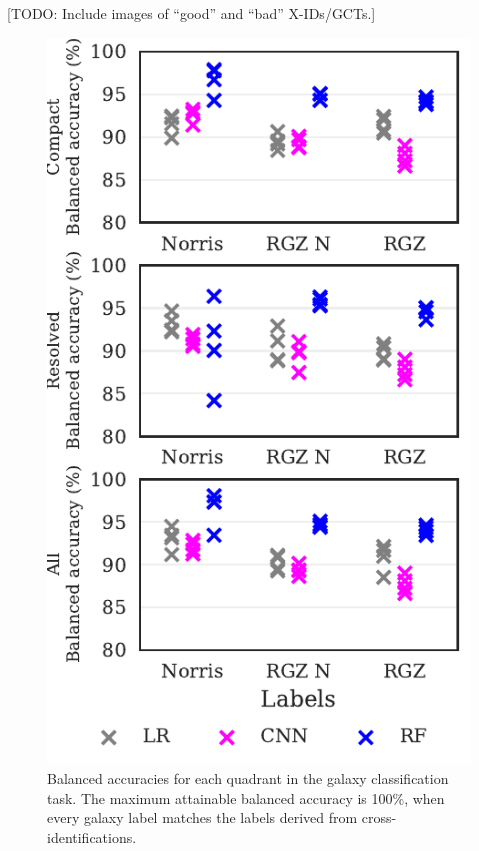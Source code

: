 \documentclass[fleqn,usenatbib,usedcolumn]{mnras}
\begin{document}
  {[}TODO: Include images of ``good'' and ``bad'' X-IDs/GCTs.{]}
  \begin{figure}
  \centering
  \includegraphics[width=\columnwidth]{images/cdfs_ba_grid.pdf}
  \caption{Balanced accuracies for each quadrant in the galaxy
    classification task. The maximum attainable balanced accuracy
    is 100\%, when every galaxy label matches the labels derived
    from \citet{norris06} cross-identifications.\label{fig:ba}}
  \end{figure}
\end{document}
